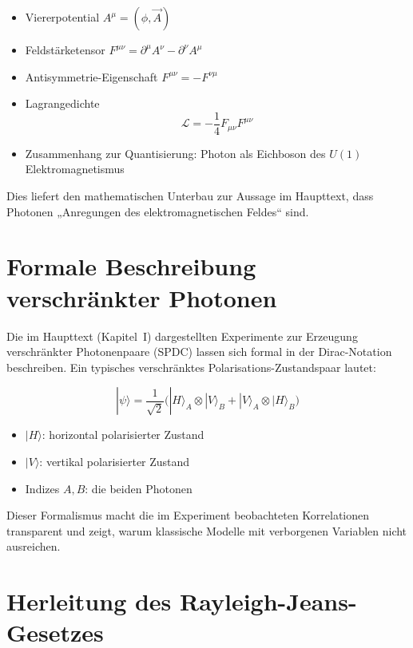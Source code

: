 \begin{itemize}
	\item Viererpotential $A^\mu = (\phi, \vec{A})$
	\item Feldstärketensor $F^{\mu\nu} = \partial^\mu A^\nu - \partial^\nu A^\mu$
	\item Antisymmetrie-Eigenschaft $F^{\mu\nu} = -F^{\nu\mu}$
	\item Lagrangedichte
	\[
	\mathcal{L} = -\frac{1}{4} F_{\mu\nu}F^{\mu\nu}
	\]
	\item Zusammenhang zur Quantisierung: Photon als Eichboson des $U(1)$
	Elektromagnetismus
\end{itemize}

Dies liefert den mathematischen Unterbau zur Aussage im Haupttext, dass
Photonen „Anregungen des elektromagnetischen Feldes“ sind.

\section{Formale Beschreibung verschränkter Photonen}
\label{anhangA:verschr}

Die im Haupttext (Kapitel~I) dargestellten Experimente zur Erzeugung
verschränkter Photonenpaare (SPDC) lassen sich formal in der
Dirac-Notation beschreiben. Ein typisches verschränktes
Polarisations-Zustandspaar lautet:

\[
|\psi\rangle = \frac{1}{\sqrt{2}}\big( |H\rangle_A \otimes |V\rangle_B +
|V\rangle_A \otimes |H\rangle_B \big)
\]

\begin{itemize}
	\item $|H\rangle$: horizontal polarisierter Zustand
	\item $|V\rangle$: vertikal polarisierter Zustand
	\item Indizes $A, B$: die beiden Photonen
\end{itemize}

Dieser Formalismus macht die im Experiment beobachteten Korrelationen
transparent und zeigt, warum klassische Modelle mit verborgenen Variablen
nicht ausreichen.

\section{Herleitung des Rayleigh-Jeans\newline-Gesetzes}
\label{anhangA:rayleigh}

